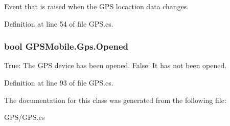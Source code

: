 Event that is raised when the GPS locaction data changes. 

Definition at line 54 of file GPS.cs.\hypertarget{class_g_p_s_mobile_1_1_gps_a3d0d76091c29c1caaa322f8fa90945c0}{
\subsubsection[{Opened}]{\setlength{\rightskip}{0pt plus 5cm}bool GPSMobile.Gps.Opened}}
\label{class_g_p_s_mobile_1_1_gps_a3d0d76091c29c1caaa322f8fa90945c0}


True: The GPS device has been opened. False: It has not been opened. 

Definition at line 93 of file GPS.cs.

The documentation for this class was generated from the following file:\begin{DoxyCompactItemize}
\item 
GPS/GPS.cs\end{DoxyCompactItemize}
